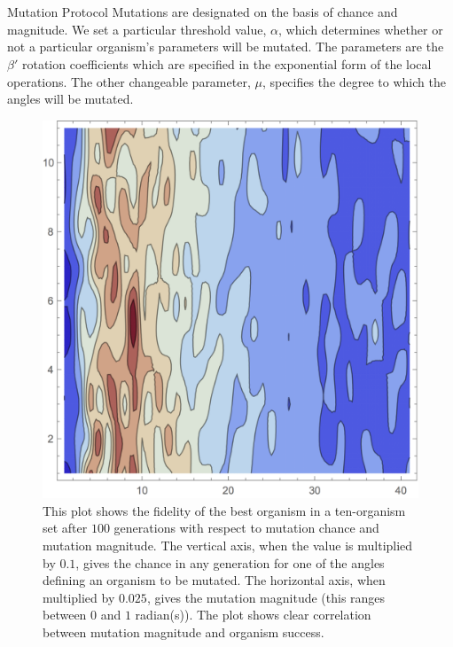 \documentclass[12pt]{beamer}
\renewcommand{\maketitle}{%
	\begin{center}%
		\Huge\inserttitle\\[5mm]%
		\Large\insertauthor\\[5mm]%
		\Large\insertinstitute%
	\end{center}%
	\vspace*{-1.5ex}%
}
\begin{document}
\begin{frame}{\maketitle}
\begin{columns}
\begin{column}{.45\textwidth}
\begin{exampleblock}{Mutation Protocol}
	Mutations are designated on the basis of chance and magnitude. We set a particular threshold value, $\alpha$, which determines whether or not a particular organism's parameters will be mutated. The parameters are the $\beta '$ rotation coefficients which are specified in the exponential form of the local operations. The other changeable parameter, $\mu$, specifies the degree to which the angles will be mutated.
	\begin{figure}[htpb]
		\centering
			\includegraphics[scale=1.05]{efficiency_plot_col.png}
		\centering
		\caption{This plot shows the fidelity of the best organism in a ten-organism set after $100$ generations with respect to mutation chance and mutation magnitude. The vertical axis, when the value is multiplied by $0.1$, gives the chance in any generation for one of the angles defining an organism to be mutated. The horizontal axis, when multiplied by $0.025$, gives the mutation magnitude (this ranges between $0$ and $1$ radian(s)). The plot shows clear correlation between mutation magnitude and organism success.}
		\label{fig:effplot}
	\end{figure}
	
\end{exampleblock}

\vspace{1em}


\end{column}
\end{columns}
\end{frame}
\end{document}
